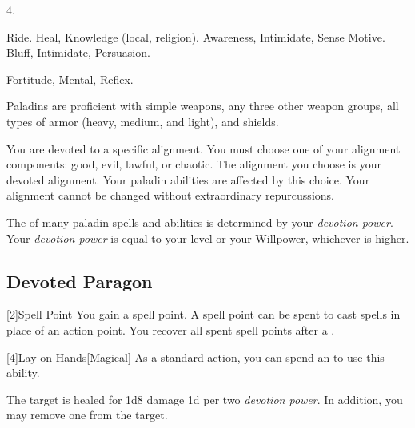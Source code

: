          4.

         Ride.
         Heal, Knowledge (local, religion).
         Awareness, Intimidate, Sense Motive.
         Bluff, Intimidate, Persuasion.

          Fortitude,  Mental,  Reflex.

        Paladins are proficient with simple weapons, any three other weapon groups, all types of armor (heavy, medium, and light), and shields.

        You are devoted to a specific alignment.
        You must choose one of your alignment components: good, evil, lawful, or chaotic.
        The alignment you choose is your devoted alignment.
        Your paladin abilities are affected by this choice.
        Your alignment cannot be changed without extraordinary repurcussions.

        The  of many paladin spells and abilities is determined by your \textit{devotion power}.
        Your \textit{devotion power} is equal to your level or your Willpower, whichever is higher.

        \subsection{Devoted Paragon}

            [2]{Spell Point}
            You gain a spell point.
            A spell point can be spent to cast spells in place of an action point.
            You recover all spent spell points after a .

            [4]{Lay on Hands}[Magical] As a standard action, you can spend an  to use this ability.
            \begin{ability}
                \begin{spelltargetinginfo}
                \end{spelltargetinginfo}
                \begin{spelleffects}
                    \spelleffect The target is healed for 1d8 damage \add 1d per two \textit{devotion power}.
                    In addition, you may remove one  from the target.
                \end{spelleffects}
            \end{ability}

